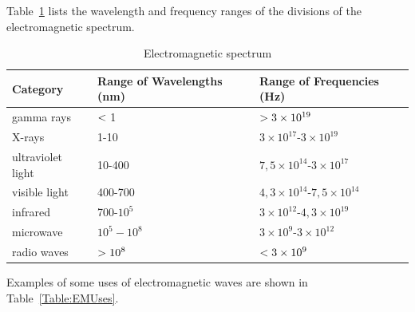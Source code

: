       \label{m38778*id187332}Table~\ref{table:EMSpectrumRanges} lists the wavelength and frequency ranges of the divisions of the electromagnetic spectrum.
          \begin{table}[H]
        \begin{center}
      \label{m38778*uid8}
    \noindent
    
      \begin{tabular}[t]{|l|l|l|}\hline
                \textbf{Category}
               &
                \textbf{Range of Wavelengths (nm)}
               &
                \textbf{Range of Frequencies (Hz)} \\ \hline
        gamma rays &
        $<{}$1 &
                $>{}3\times{10}^{19}$ \\ \hline
        X-rays &
        1-10 &
        $3\ensuremath{\times}{10}^{17}$-$3\ensuremath{\times}{10}^{19}$ \\ \hline
        ultraviolet light &
        10-400 &
        $7,5\ensuremath{\times}{10}^{14}$-$3\ensuremath{\times}{10}^{17}$ \\ \hline
        visible light &
        400-700 &
        $4,3\ensuremath{\times}{10}^{14}$-$7,5\ensuremath{\times}{10}^{14}$ \\ \hline
        infrared &
        700-${10}^{5}$ &
        $3\ensuremath{\times}{10}^{12}$-$4,3\ensuremath{\times}{10}^{19}$ \\ \hline
        microwave &
                ${10}^{5}-{10}^{8}$
               &
        $3\ensuremath{\times}{10}^{9}$-$3\ensuremath{\times}{10}^{12}$ \\ \hline
        radio waves &
                $>{}{10}^{8}$
               &
                $<{}3\times{10}^{9}$ \\ \hline
    \end{tabular}
      \end{center}
    \label{table:EMSpectrumRanges}
    \caption{Electromagnetic spectrum}
\end{table}
    \par
      \label{m38778*id188548}Examples of some uses of electromagnetic waves are shown in Table~\ref{Table:EMUses}.\par 
